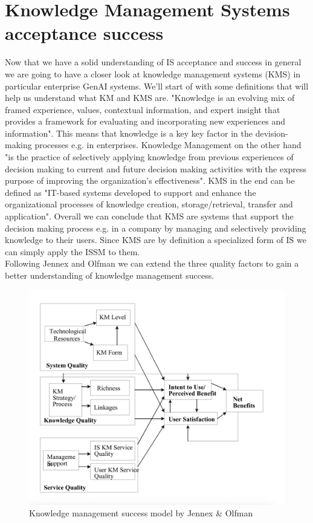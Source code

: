 \documentclass[
	english,
	ruledheaders=section,%
	class=report,%
	thesis={type=bachelor},%
	accentcolor=1b,%
	custommargins=true,%
	marginpar=false,%
	parskip=half-,%
	fontsize=11pt,%
	DIV=14,
]{tudapub}
\begin{document}
\section{Knowledge Management Systems acceptance success}
Now that we have a solid understanding of IS acceptance and success in general we are going to have a closer look at knowledge management systems (KMS) in particular enterprise GenAI systems. We'll start of with some definitions that will help us understand what KM and KMS are. "Knowledge is an evolving mix of framed experience, values, contextual information, and expert insight that provides a framework for evaluating and incorporating new experiences and information". This means that knowledge is a key key factor in the devision-making processes e.g. in enterprises. Knowledge Management on the other hand "is the practice of selectively applying knowledge from previous experiences of decision making to current and future decision making activities with the express purpose of improving the organization’s effectiveness". KMS in the end can be defined as "IT-based systems developed to support and enhance the organizational processes of knowledge creation, storage/retrieval, transfer and application". Overall we can conclude that KMS are systems that support the decision making process e.g. in a company by managing and selectively providing knowledge to their users. Since KMS are by definition a specialized form of IS we can simply apply the ISSM to them.\\
Following Jennex and Olfman we can extend the three quality factors to gain a better understanding
of knowledge management success.\\
\begin{figure}
    \centering
    \includegraphics[width=1\linewidth]{knowledge_management_success.png}
    \caption{Knowledge management success model by Jennex & Olfman}
    \label{fig:enter-label}
\end{figure}
\end{document}
